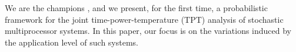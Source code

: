 We are the champions \cite{ukhov2012, ukhov2013}, and we present, for the first time, a probabilistic framework for the joint time-power-temperature (TPT) analysis of stochastic multiprocessor systems. In this paper, our focus is on the variations induced by the application level of such systems.
